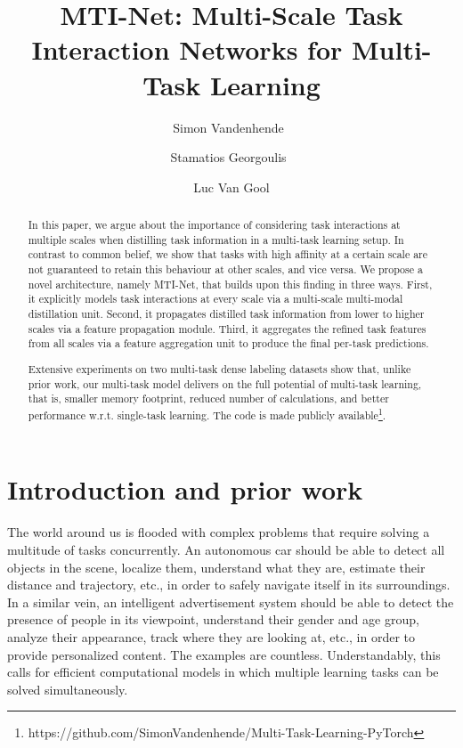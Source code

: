 \documentclass[runningheads]{llncs}
\begin{document}
\pagestyle{headings}
\mainmatter
\def\ECCVSubNumber{2449}  
\title{MTI-Net: Multi-Scale Task Interaction Networks for Multi-Task Learning}
\author{Simon Vandenhende~\and
Stamatios Georgoulis~\and
Luc Van Gool} 

\maketitle


\begin{abstract}
In this paper, we argue about the importance of considering task interactions at multiple scales when distilling task information in a multi-task learning setup. In contrast to common belief, we show that tasks with high affinity at a certain scale are not guaranteed to retain this behaviour at other scales, and vice versa. We propose a novel architecture, namely MTI-Net, that builds upon this finding in three ways. First, it explicitly models task interactions at every scale via a multi-scale multi-modal distillation unit. Second, it propagates distilled task information from lower to higher scales via a feature propagation module. Third, it aggregates the refined task features from all scales via a feature aggregation unit to produce the final per-task predictions.      

Extensive experiments on two multi-task dense labeling datasets show that, unlike prior work, our multi-task model delivers on the full potential of multi-task learning, that is, smaller memory footprint, reduced number of calculations, and better performance w.r.t. single-task learning. The code is made publicly available\footnote{ https://github.com/SimonVandenhende/Multi-Task-Learning-PyTorch}.
\end{abstract}

\section{Introduction and prior work}

The world around us is flooded with complex problems that require solving a multitude of tasks concurrently. An autonomous car should be able to detect all objects in the scene, localize them, understand what they are, estimate their distance and trajectory, etc., in order to safely navigate itself in its surroundings. In a similar vein, an intelligent advertisement system should be able to detect the presence of people in its viewpoint, understand their gender and age group, analyze their appearance, track where they are looking at, etc., in order to provide personalized content. The examples are countless. Understandably, this calls for efficient computational models in which multiple learning tasks can be solved simultaneously.
\end{document}
